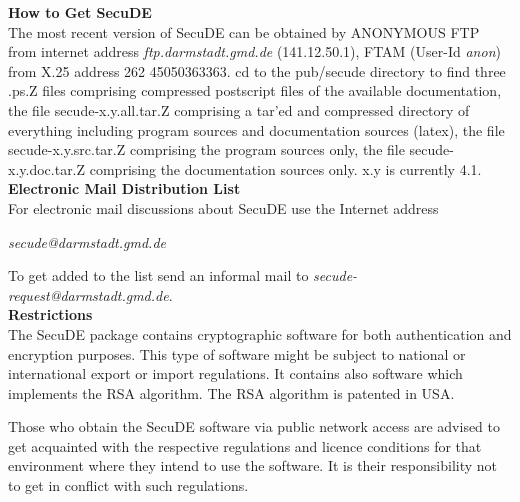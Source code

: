 {        
	\newpage
	{\Large\bf How to Get SecuDE}
	\\ [1em]	
        The most recent version of SecuDE can be obtained by 
	\bi
        \m ANONYMOUS FTP from internet address {\em ftp.darmstadt.gmd.de} (141.12.50.1), 
        \m FTAM (User-Id {\em anon}) from X.25 address 262 45050363363.
	\ei 
        cd to the pub/secude directory to find 
	\bi
        \m three .ps.Z files comprising compressed postscript files of the available
           documentation,
        \m the file secude-x.y.all.tar.Z comprising a tar'ed and compressed directory 
           of everything including program sources and documentation sources (latex),
        \m the file secude-x.y.src.tar.Z comprising the program sources only,
        \m the file secude-x.y.doc.tar.Z comprising the documentation sources only.
	\ei
	x.y is currently 4.1.
	\\ [1cm]
	{\Large\bf Electronic Mail Distribution List}
	\\ [1em]
	For electronic mail discussions about SecuDE use the Internet address
	
	{\em secude@darmstadt.gmd.de}
	
	To get added to the list send an informal mail to {\em secude-request@darmstadt.gmd.de}. 
	\\ [1cm]	
	{\Large\bf Restrictions}
	\\ [1em]
	The SecuDE package contains cryptographic software for both authentication and
        encryption purposes. This type of software might be subject to national or
        international export or import regulations. It contains also software which
	implements the RSA algorithm. The RSA algorithm is patented in USA.
	
	Those who obtain the SecuDE software via public network access are advised to get
        acquainted with the respective regulations and licence conditions for that
	environment where they intend to use the software. It is their responsibility
	not to get in conflict with such regulations.
}
